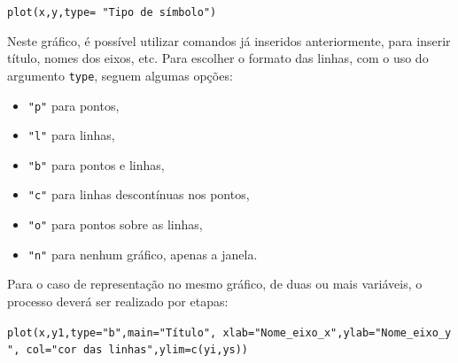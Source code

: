 \documentclass[12pt,brazil,oneside]{book}
\newenvironment{Shaded}{\begin{snugshade}}{\end{snugshade}}
\newcommand{\DataTypeTok}[1]{\textcolor[rgb]{0.13,0.29,0.53}{#1}}
\newcommand{\DecValTok}[1]{\textcolor[rgb]{0.00,0.00,0.81}{#1}}
\newcommand{\KeywordTok}[1]{\textcolor[rgb]{0.13,0.29,0.53}{\textbf{#1}}}
\newcommand{\NormalTok}[1]{#1}
\newcommand{\OperatorTok}[1]{\textcolor[rgb]{0.81,0.36,0.00}{\textbf{#1}}}
\newcommand{\StringTok}[1]{\textcolor[rgb]{0.31,0.60,0.02}{#1}}
\providecommand{\tightlist}{%
  \setlength{\itemsep}{0pt}\setlength{\parskip}{0pt}}
\begin{document}
\texttt{plot(x,y,type=\ "Tipo\ de\ símbolo")}

Neste gráfico, é possível utilizar comandos já inseridos anteriormente, para inserir título, nomes dos eixos, etc. Para escolher o formato das linhas, com o uso do argumento \texttt{type}, seguem algumas opções:

\begin{itemize}
\tightlist
\item
  \texttt{"p"} para pontos,
\item
  \texttt{"l"} para linhas,
\item
  \texttt{"b"} para pontos e linhas,
\item
  \texttt{"c"} para linhas descontínuas nos pontos,
\item
  \texttt{"o"} para pontos sobre as linhas,
\item
  \texttt{"n"} para nenhum gráfico, apenas a janela.
\end{itemize}

Para o caso de representação no mesmo gráfico, de duas ou mais variáveis, o processo deverá ser realizado por etapas:

\texttt{plot(x,y1,type="b",main="Título",\ xlab="Nome\_eixo\_x",ylab="Nome\_eixo\_y",\ col="cor\ das\ linhas",ylim=c(yi,ys))}

\begin{Shaded}
\end{Shaded}
\end{document}
